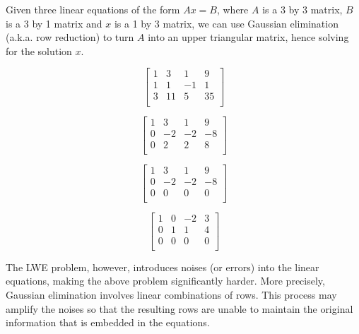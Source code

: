 \documentclass[../main.tex]{subfiles}
\begin{document}
\begin{example}
Given three linear equations of the form $Ax=B$, where $A$ is a 3 by 3 matrix, $B$ is a 3 by 1 matrix and $x$ is a 1 by 3 matrix, we can use Gaussian elimination (a.k.a. row reduction) to turn $A$ into an upper triangular matrix, hence solving for the solution $x$. 
\begin{small}
\[
\left[
\begin{array}{ccc|c}
1 & 3 & 1 & 9  \\
1 & 1 & -1 & 1  \\
3 & 11 & 5 & 35  \\
\end{array}
\right]
\]    

\[
\left[
\begin{array}{ccc|c}
1 & 3 & 1 & 9  \\
0 & -2 & -2 & -8  \\
0 & 2 & 2 & 8  \\
\end{array}
\right]
\]    

\[
\left[
\begin{array}{ccc|c}
1 & 3 & 1 & 9  \\
0 & -2 & -2 & -8  \\
0 & 0 & 0 & 0  \\
\end{array}
\right]
\]

\[
\left[
\begin{array}{ccc|c}
1 & 0 & -2 & 3  \\
0 & 1 & 1 & 4  \\
0 & 0 & 0 & 0  \\
\end{array}
\right]
\]
\end{small}
\end{example}
\noindent The LWE problem, however, introduces noises (or errors) into the linear equations, making the above problem significantly harder. More precisely, Gaussian elimination involves linear combinations of rows. This process may amplify the noises so that the resulting rows are unable to maintain the original information that is embedded in the equations. 

\end{document}
